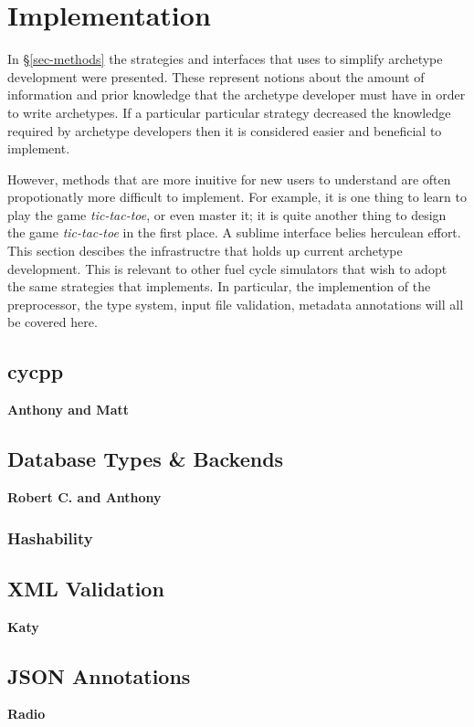 \section{Implementation}
\label{sec-impl}

In \S \ref{sec-methods} the strategies and interfaces that \Cyclus uses to 
simplify archetype development were presented. These represent notions about
the amount of information and prior knowledge that the archetype developer 
must have in order to write archetypes.  If a particular particular strategy 
decreased the knowledge required by archetype developers then it is considered
easier and beneficial to implement.  

However, methods that are more inuitive for new users to understand are often
propotionatly more difficult to implement. For example, it is one thing to 
learn to play the game \emph{tic-tac-toe}, or even master it; it is quite another
thing to design the game \emph{tic-tac-toe} in the first place.  
A sublime interface belies 
herculean effort. This section descibes the infrastructre that holds up 
current \cyclus archetype development.  This is relevant to other fuel 
cycle simulators that wish to adopt the same strategies that \cyclus 
implements. In particular, the implemention of the \cyclus preprocessor, 
the type system, input file validation, metadata annotations will all 
be covered here.

\subsection{cycpp}

\textbf{Anthony and Matt}

\subsection{Database Types \& Backends}

\textbf{Robert C. and Anthony}

\subsubsection{Hashability}

\subsection{XML Validation}

\textbf{Katy}

\subsection{JSON Annotations}

\textbf{Radio}
